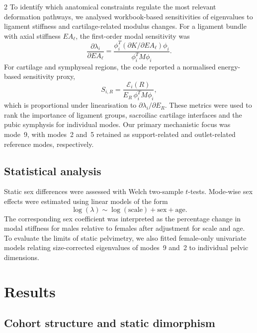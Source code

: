 \documentclass[openacc]{rsproca_new}
\begin{document}
\begin{multicols}{2}
To identify which anatomical constraints regulate the most relevant deformation pathways, we analysed workbook-based sensitivities of eigenvalues to ligament stiffness and cartilage-related modulus changes. For a ligament bundle with axial stiffness $EA_{\ell}$, the first-order modal sensitivity was
\begin{equation}
\frac{\partial \lambda_{i}}{\partial EA_{\ell}}
=
\frac{\phi_{i}^{T}(\partial K/\partial EA_{\ell})\phi_{i}}
{\phi_{i}^{T}M\phi_{i}}.
\end{equation}
For cartilage and symphyseal regions, the code reported a normalised energy-based sensitivity proxy,
\begin{equation}
S_{i,R}=\frac{\mathcal{E}_{i}(R)}{E_{R}\,\phi_{i}^{T}M\phi_{i}},
\end{equation}
which is proportional under linearisation to $\partial \lambda_{i}/\partial E_{R}$. These metrics were used to rank the importance of ligament groups, sacroiliac cartilage interfaces and the pubic symphysis for individual modes. Our primary mechanistic focus was mode~9, with modes~2 and~5 retained as support-related and outlet-related reference modes, respectively.

\subsection{Statistical analysis}

Static sex differences were assessed with Welch two-sample $t$-tests. Mode-wise sex effects were estimated using linear models of the form
\begin{equation}
\log(\lambda) \sim \log(\mathrm{scale}) + \mathrm{sex} + \mathrm{age}.
\end{equation}
The corresponding sex coefficient was interpreted as the percentage change in modal stiffness for males relative to females after adjustment for scale and age. To evaluate the limits of static pelvimetry, we also fitted female-only univariate models relating size-corrected eigenvalues of modes~9 and~2 to individual pelvic dimensions.

\section{Results}

\subsection{Cohort structure and static dimorphism}


\end{multicols}
\end{document}
